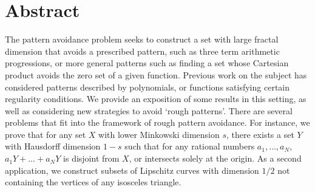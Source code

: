 
\chapter{Abstract}


The pattern avoidance problem seeks to construct a set with large fractal dimension that avoids a prescribed pattern, such as three term arithmetic progressions, or more general patterns such as finding a set whose Cartesian product avoids the zero set of a given function. Previous work on the subject has considered patterns described by polynomials, or functions satisfying certain regularity conditions. We provide an exposition of some results in this setting, as well as considering new strategies to avoid `rough patterns'. There are several problems that fit into the framework of rough pattern avoidance. For instance, we prove that for any set $X$ with lower Minkowski dimension $s$, there exists a set $Y$ with Hausdorff dimension $1-s$ such that for any rational numbers $a_1, \dots, a_N$, $a_1Y + \dots + a_NY$ is disjoint from $X$, or intersects solely at the origin. As a second application, we construct subsets of Lipschitz curves with dimension $1/2$ not containing the vertices of any isosceles triangle.